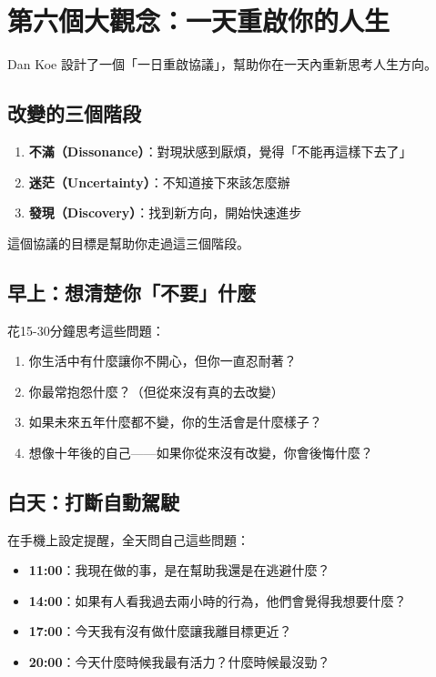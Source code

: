 \documentclass[12pt,a4paper]{article}
\begin{document}
\section{第六個大觀念：一天重啟你的人生}

Dan Koe 設計了一個「一日重啟協議」，幫助你在一天內重新思考人生方向。

\subsection{改變的三個階段}

\begin{enumerate}
    \item \textbf{不滿（Dissonance）}：對現狀感到厭煩，覺得「不能再這樣下去了」
    \item \textbf{迷茫（Uncertainty）}：不知道接下來該怎麼辦
    \item \textbf{發現（Discovery）}：找到新方向，開始快速進步
\end{enumerate}

這個協議的目標是幫助你走過這三個階段。

\subsection{早上：想清楚你「不要」什麼}

花15-30分鐘思考這些問題：

\begin{enumerate}
    \item 你生活中有什麼讓你不開心，但你一直忍耐著？
    \item 你最常抱怨什麼？（但從來沒有真的去改變）
    \item 如果未來五年什麼都不變，你的生活會是什麼樣子？
    \item 想像十年後的自己——如果你從來沒有改變，你會後悔什麼？
\end{enumerate}

\subsection{白天：打斷自動駕駛}

在手機上設定提醒，全天問自己這些問題：

\begin{itemize}
    \item \textbf{11:00}：我現在做的事，是在幫助我還是在逃避什麼？
    \item \textbf{14:00}：如果有人看我過去兩小時的行為，他們會覺得我想要什麼？
    \item \textbf{17:00}：今天我有沒有做什麼讓我離目標更近？
    \item \textbf{20:00}：今天什麼時候我最有活力？什麼時候最沒勁？
\end{itemize}
\end{document}
